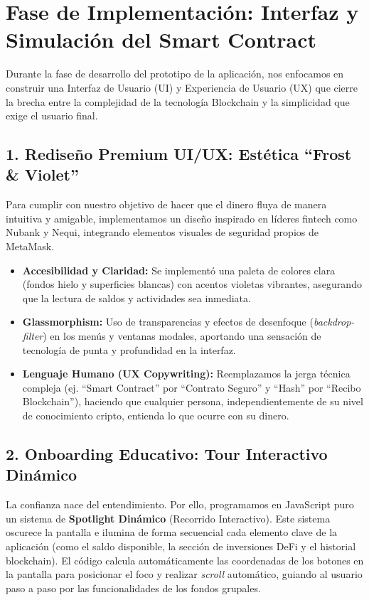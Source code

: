 \documentclass[12pt,a4paper]{article}
\begin{document}
\section*{Fase de Implementación: Interfaz y Simulación del Smart Contract}

Durante la fase de desarrollo del prototipo de la aplicación, nos enfocamos en construir una Interfaz de Usuario (UI) y Experiencia de Usuario (UX) que cierre la brecha entre la complejidad de la tecnología Blockchain y la simplicidad que exige el usuario final. 

\subsection*{1. Rediseño Premium UI/UX: Estética ``Frost \& Violet''}
Para cumplir con nuestro objetivo de hacer que el dinero fluya de manera intuitiva y amigable, implementamos un diseño inspirado en líderes fintech como Nubank y Nequi, integrando elementos visuales de seguridad propios de MetaMask.
\begin{itemize}
    \item \textbf{Accesibilidad y Claridad:} Se implementó una paleta de colores clara (fondos hielo y superficies blancas) con acentos violetas vibrantes, asegurando que la lectura de saldos y actividades sea inmediata.
    \item \textbf{Glassmorphism:} Uso de transparencias y efectos de desenfoque (\textit{backdrop-filter}) en los menús y ventanas modales, aportando una sensación de tecnología de punta y profundidad en la interfaz.
    \item \textbf{Lenguaje Humano (UX Copywriting):} Reemplazamos la jerga técnica compleja (ej. ``Smart Contract'' por ``Contrato Seguro'' y ``Hash'' por ``Recibo Blockchain''), haciendo que cualquier persona, independientemente de su nivel de conocimiento cripto, entienda lo que ocurre con su dinero.
\end{itemize}

\subsection*{2. Onboarding Educativo: Tour Interactivo Dinámico}
La confianza nace del entendimiento. Por ello, programamos en JavaScript puro un sistema de \textbf{Spotlight Dinámico} (Recorrido Interactivo). Este sistema oscurece la pantalla e ilumina de forma secuencial cada elemento clave de la aplicación (como el saldo disponible, la sección de inversiones DeFi y el historial blockchain). El código calcula automáticamente las coordenadas de los botones en la pantalla para posicionar el foco y realizar \textit{scroll} automático, guiando al usuario paso a paso por las funcionalidades de los fondos grupales.
\end{document}
